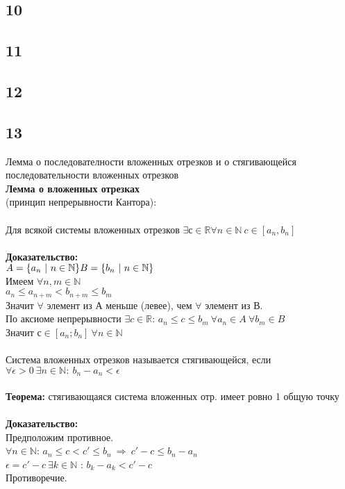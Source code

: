 		\subsection{10}
		
		\subsection{11}
		
		\subsection{12}
		
		\subsection{13}
		Лемма о последователности вложенных отрезков и о стягивающейся последовательности вложенных отрезков\\
		\textbf{Лемма о вложенных отрезках} \\
		(принцип непрерывности Кантора):\\
		\\
		Для всякой системы вложенных отрезков $\exists с \in \mathbb{R}\forall n \in \mathbb{N} \ c \in [a_n, b_n]$ \\
		\\
		\textbf{Доказательство: } \\$
		A = \{ a_n\ | \ n \in \mathbb{N} \} \\
		B = \{ b_n\ | \ n \in \mathbb{N} \}$ \\
		Имеем $\forall n, m \in \mathbb{N}$ \\
		$a_n \leqslant a_{n + m} < b_{n + m} \leqslant b_m$ \\
		Значит $\forall$ элемент из $А$ меньше (левее), чем $\forall$ элемент из $В$. \\
		По аксиоме непрерывности $\exists c \in \mathbb{R}$: $a_n \leqslant c \leqslant b_m \ \forall a_n \in A \ \forall b_m \in B$ \\
		Значит $ с \in [a_n;b_n] \ \forall n \in \mathbb{N}$ \\
		\\
		Система вложенных отрезков называется стягивающейся, если \\
		$\forall \epsilon > 0 \ \exists n \in \mathbb{N}: \ b_n - a_n < \epsilon$\\
		\\
		\textbf{Теорема: }
		стягивающаяся система вложенных отр. имеет ровно 1 общую точку \\
		\\
		\textbf{Доказательство:} \\
		Предположим противное. \\
		$\forall n \in \mathbb{N}$: $a_n \leqslant c < c' \leqslant b_n \ \Rightarrow \ c' - c \leqslant b_n - a_n$ \\
		$\epsilon = c' - c \ \exists k \in \mathbb{N}$ : $b_k - a_k < c' -c$\\
		Противоречие.

